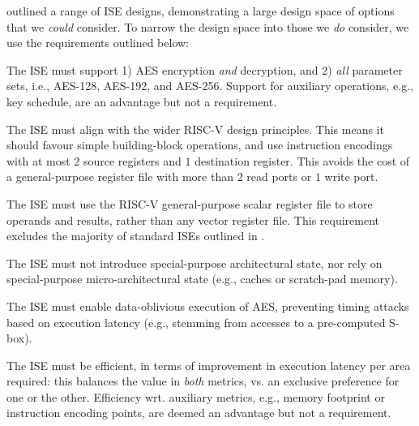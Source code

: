 
outlined a range of ISE designs, demonstrating a large design space of
options that we {\em could} consider.  To narrow the design space into
those we {\em do} consider, we use the requirements outlined below:

\begin{requirement}\label{req:1}
The ISE must support
1) AES encryption {\em and} decryption,
   and
2) {\em all} parameter sets, i.e., AES-128, AES-192, and AES-256.
Support for 
auxiliary operations, e.g., key schedule, 
are an advantage but not a requirement.
\end{requirement}

\begin{requirement}\label{req:2}
The ISE must align with the wider RISC-V design principles.
This means it should 
favour simple building-block operations,
and
use instruction encodings with at most
$2$ source registers and
$1$ destination register.
This avoids the cost of a general-purpose register file with more than $2$
read ports or $1$ write port.
\end{requirement}

\begin{requirement}\label{req:3}
The ISE must use
the RISC-V general-purpose scalar register file 
to store operands and results, rather than
any vector register file.
This requirement excludes the majority of standard ISEs outlined in 
.
\end{requirement}

\begin{requirement}\label{req:4}
The ISE must not introduce
special-purpose       architectural state, 
nor rely on
special-purpose micro-architectural state
(e.g., caches or scratch-pad memory).
\end{requirement}

\begin{requirement}\label{req:5}
The ISE must enable data-oblivious execution of AES, preventing
timing attacks based on execution latency
(e.g., stemming from accesses to a pre-computed S-box).
\end{requirement}

\begin{requirement}
The ISE must be efficient, in terms of improvement in execution latency 
per area required: this balances the value in {\em both} metrics, vs. an 
exclusive preference for one or the other.
Efficiency wrt. 
auxiliary metrics, e.g., memory footprint or instruction encoding points,
are deemed an advantage but not a requirement.
\end{requirement}

